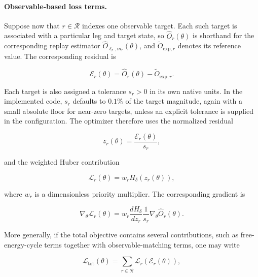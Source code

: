 \paragraph{Observable-based loss terms.}

Suppose now that $r \in \mathcal{R}$ indexes one observable target. Each such target is associated with a particular leg and target state, so $\widehat{O}_r(\theta)$ is shorthand for the corresponding replay estimator $\widehat{O}_{\ell_r,m_r}(\theta)$, and $\widetilde{O}_{\mathrm{exp},r}$ denotes its reference value. The corresponding residual is

\begin{equation}
    \mathcal{E}_r(\theta)
    =
    \widehat{O}_r(\theta)
    -
    \widetilde{O}_{\mathrm{exp},r}.
    \label{eq:obsresidual}
\end{equation}

Each target is also assigned a tolerance $s_r > 0$ in its own native units. In the implemented code, $s_r$ defaults to $0.1\%$ of the target magnitude, again with a small absolute floor for near-zero targets, unless an explicit tolerance is supplied in the configuration. The optimizer therefore uses the normalized residual

\begin{equation}
    z_r(\theta)
    =
    \frac{\mathcal{E}_r(\theta)}{s_r},
    \label{eq:obs_normalized_residual}
\end{equation}

and the weighted Huber contribution

\begin{equation}
    \mathcal{L}_r(\theta)
    =
    w_r H_\delta\!\left(z_r(\theta)\right),
    \label{eq:obs_target_loss}
\end{equation}

where $w_r$ is a dimensionless priority multiplier. The corresponding gradient is

\begin{equation}
    \nabla_\theta \mathcal{L}_r(\theta)
    =
    w_r
    \frac{d H_\delta}{dz_r}
    \frac{1}{s_r}
    \nabla_\theta \widehat{O}_r(\theta).
    \label{eq:obslossgrad}
\end{equation}

More generally, if the total objective contains several contributions, such as free-energy-cycle terms together with observable-matching terms, one may write

\begin{equation}
    \mathcal{L}_{\mathrm{tot}}(\theta)
    =
    \sum_{r \in \mathcal{R}}
    \mathcal{L}_r(\mathcal{E}_r(\theta)),
    \label{eq:totalloss}
\end{equation}


